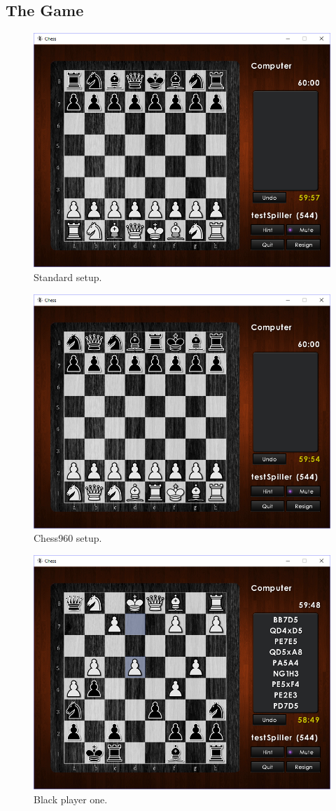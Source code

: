 \documentclass[12pt, a4paper]{article}
\begin{document}
\newpage
\vfill
\subsection{The Game}
\begin{figure}[ht!]
	\centering
	\includegraphics[width=0.725\linewidth]{figures/standard.png}
	\caption{Standard setup.}
\end{figure}
\begin{figure}[ht!]
	\centering
	\includegraphics[width=0.725\linewidth]{figures/chess960.png}
	\caption{Chess960 setup.}
\end{figure}
\begin{figure}[ht!]
    \centering
	\includegraphics[width=0.8\linewidth]{figures/black.png}
	\caption{Black player one.}
\end{figure}
\end{document}
